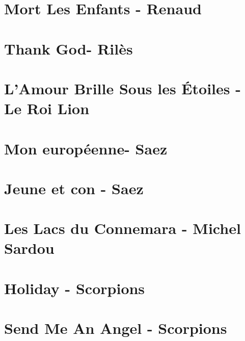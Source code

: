 \documentclass[11pt]{article}
\begin{document}
\section{Mort Les Enfants - Renaud}
\begin{guitar}

\end{guitar}

\section{Thank God- Rilès}
\begin{guitar}

\end{guitar}

\section{L'Amour Brille Sous les Étoiles - Le Roi Lion}


\section{Mon européenne- Saez}
\begin{guitar}

\end{guitar}


\section{Jeune et con - Saez}
\begin{guitar}

\end{guitar}

\section{Les Lacs du Connemara - Michel Sardou}
\begin{guitar}

\end{guitar}

\section*{Holiday - Scorpions}
\begin{guitar}

\end{guitar}

\section{Send Me An Angel - Scorpions}
\begin{guitar}

\end{guitar}
\end{document}
